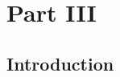 \documentclass[../main.tex]{subfiles}
\begin{document}

\section*{Part III}
\setcounter{section}{3}
\setcounter{subsection}{0}

\subsection{Introduction}
\label{sec:III_intro}
\end{document}
